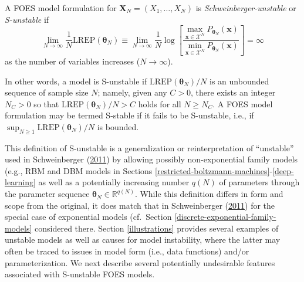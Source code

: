 \documentclass[]{article}
\theoremstyle{definition}
\newcommand{\REP}{\mathrm{LREP}}
\let\BeginKnitrBlock\begin \let\EndKnitrBlock\end
\begin{document}
\BeginKnitrBlock{definition}[S-unstable FOES model]
\protect\hypertarget{def:instabFSFS}{}{\label{def:instabFSFS}
\iffalse (S-unstable FOES model) \fi{} }A FOES model formulation for
\(\boldsymbol X_N=(X_1,\ldots,X_N)\) is \emph{Schweinberger-unstable} or
\emph{S-unstable} if
\begin{equation}
\label{eq:Sun}
\lim \limits_{N \rightarrow \infty} \frac{1}{N} \REP(\boldsymbol \theta_N) \equiv \lim \limits_{N \rightarrow \infty} \frac{1}{N}\log \left[\frac{\max\limits_{  \boldsymbol x\in \mathcal{X}^N}P_{\boldsymbol \theta_N}( \boldsymbol x)}{\min\limits_{ \boldsymbol x \in \mathcal{X}^N}P_{\boldsymbol \theta_N}( \boldsymbol x)}\right] = \infty
\end{equation}
as the number of variables increases (\(N \rightarrow \infty\)).
\EndKnitrBlock{definition} In other words, a model is S-unstable if
\(\REP(\boldsymbol \theta_N)/N\) is an unbounded sequence of sample size
\(N\); namely, given any \(C > 0\), there exists an integer \(N_C > 0\)
so that \(\REP(\boldsymbol \theta_N)/N > C\) holds for all
\(N \ge N_C\). A FOES model formulation may be termed S-stable if it
fails to be S-unstable, i.e., if
\(\sup_{N \geq 1}\REP(\boldsymbol \theta_N)/N\) is bounded.

This definition of S-unstable is a generalization or reinterpretation of
``unstable'' used in Schweinberger
(\protect\hyperlink{ref-schweinberger2011instability}{2011}) by allowing
possibly non-exponential family models (e.g., RBM and DBM models in
Sections \ref{restricted-boltzmann-machines}-\ref{deep-learning} as well
as a potentially increasing number \(q(N)\) of parameters through the
parameter sequence \(\boldsymbol \theta_N\in \mathbb{R}^{q(N)}\). While
this definition differs in form and scope from the original, it does
match that in Schweinberger
(\protect\hyperlink{ref-schweinberger2011instability}{2011}) for the
special case of exponential models (cf.~Section
\ref{discrete-exponential-family-models} considered there. Section
\ref{illustrations} provides several examples of unstable models as well
as causes for model instability, where the latter may often be traced to
issues in model form (i.e., data functions) and/or parameterization. We
next describe several potentially undesirable features associated with
S-unstable FOES models.
\end{document}
